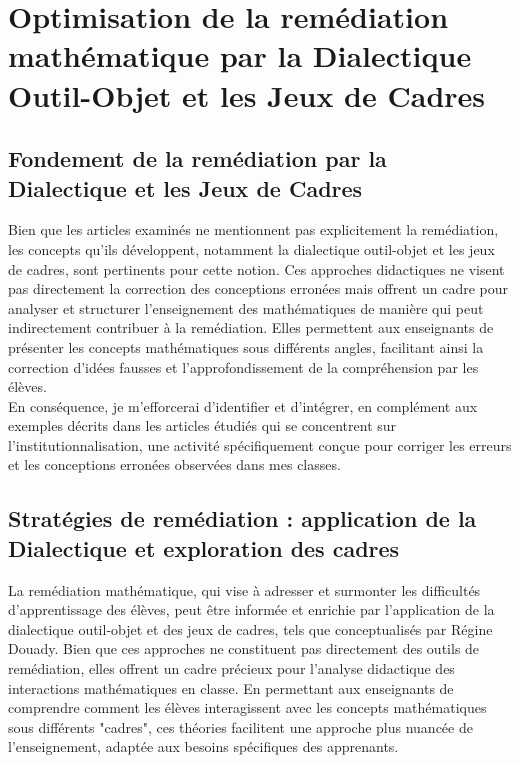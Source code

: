 \section{Optimisation de la remédiation mathématique par la Dialectique Outil-Objet et les Jeux de Cadres}

\subsection{Fondement de la remédiation par la Dialectique et les Jeux de Cadres}

Bien que les articles examinés ne mentionnent pas explicitement la remédiation,
les concepts qu'ils développent,
notamment la dialectique outil-objet et les jeux de cadres,
sont pertinents pour cette notion.
Ces approches didactiques ne visent pas directement la correction des conceptions erronées mais offrent un cadre pour analyser et structurer l'enseignement des mathématiques de manière qui peut indirectement contribuer à la remédiation.
Elles permettent aux enseignants de présenter les concepts mathématiques sous différents angles,
facilitant ainsi la correction d'idées fausses et l'approfondissement de la compréhension par les élèves.\\

En conséquence,
je m'efforcerai d'identifier et d'intégrer,
en complément aux exemples décrits dans les articles étudiés qui se concentrent sur l'institutionnalisation,
une activité spécifiquement conçue pour corriger les erreurs et les conceptions erronées observées dans mes classes.

\subsection{Stratégies de remédiation : application de la Dialectique et exploration des cadres}

La remédiation mathématique,
qui vise à adresser et surmonter les difficultés d'apprentissage des élèves,
peut être informée et enrichie par l'application de la dialectique outil-objet et des jeux de cadres,
tels que conceptualisés par Régine Douady.
Bien que ces approches ne constituent pas directement des outils de remédiation,
elles offrent un cadre précieux pour l'analyse didactique des interactions mathématiques en classe.
En permettant aux enseignants de comprendre comment les élèves interagissent avec les concepts mathématiques sous différents "cadres",
ces théories facilitent une approche plus nuancée de l'enseignement,
adaptée aux besoins spécifiques des apprenants.\\

